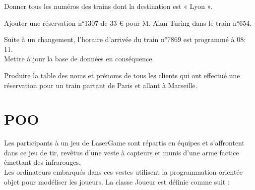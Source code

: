 \documentclass[a4paper,12pt,eval,firamath]{nsi}
\begin{document}
            \begin{enumalph}

                  \item Donner tous les numéros des trains dont la destination est « Lyon ».\\
                  
                  
                  \item Ajouter une réservation n°1307 de 33 € pour M. Alan Turing dans le train n°654.\\
                  
                  
                  
                  \item Suite à un changement, l'horaire d'arrivée du train n°7869 est programmé à 08: 11.\\
                  Mettre à jour la base de données en conséquence.\\
                  
                  \item Produire la table des noms et prénoms de tous les clients qui ont effectué une réservation pour un train partant de Paris et allant à Marseille.\\
                  
            \end{enumalph}


\section{POO}
\resetquestion

Les participants à un jeu de LaserGame sont répartis en équipes et s'affrontent dans ce jeu de tir, revêtus d'une veste à capteurs et munis d'une arme factice émettant des infrarouges.\\
Les ordinateurs embarqués dans ces vestes utilisent la programmation orientée objet pour modéliser les joueurs. La classe Joueur est définie comme suit :
\end{document}
